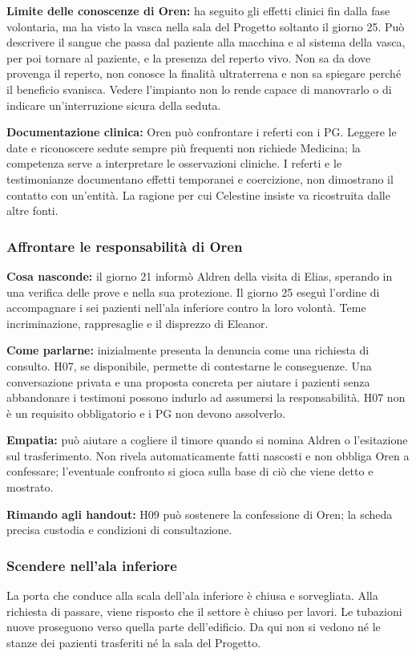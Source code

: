 \documentclass[11pt,a4paper]{article}
\begin{document}
\textbf{Limite delle conoscenze di Oren:} ha seguito gli effetti clinici fin dalla fase volontaria, ma ha visto la vasca nella sala del Progetto soltanto il giorno 25. Può descrivere il sangue che passa dal paziente alla macchina e al sistema della vasca, per poi tornare al paziente, e la presenza del reperto vivo. Non sa da dove provenga il reperto, non conosce la finalità ultraterrena e non sa spiegare perché il beneficio svanisca. Vedere l'impianto non lo rende capace di manovrarlo o di indicare un'interruzione sicura della seduta.

\textbf{Documentazione clinica:} Oren può confrontare i referti con i PG. Leggere le date e riconoscere sedute sempre più frequenti non richiede Medicina; la competenza serve a interpretare le osservazioni cliniche. I referti e le testimonianze documentano effetti temporanei e coercizione, non dimostrano il contatto con un'entità. La ragione per cui Celestine insiste va ricostruita dalle altre fonti.

\subsubsection{Affrontare le responsabilità di Oren}
\textbf{Cosa nasconde:} il giorno 21 informò Aldren della visita di Elias, sperando in una verifica delle prove e nella sua protezione. Il giorno 25 eseguì l'ordine di accompagnare i sei pazienti nell'ala inferiore contro la loro volontà. Teme incriminazione, rappresaglie e il disprezzo di Eleanor.

\textbf{Come parlarne:} inizialmente presenta la denuncia come una richiesta di consulto. H07, se disponibile, permette di contestarne le conseguenze. Una conversazione privata e una proposta concreta per aiutare i pazienti senza abbandonare i testimoni possono indurlo ad assumersi la responsabilità. H07 non è un requisito obbligatorio e i PG non devono assolverlo.

\textbf{Empatia:} può aiutare a cogliere il timore quando si nomina Aldren o l'esitazione sul trasferimento. Non rivela automaticamente fatti nascosti e non obbliga Oren a confessare; l'eventuale confronto si gioca sulla base di ciò che viene detto e mostrato.

\textbf{Rimando agli handout:} H09 può sostenere la confessione di Oren; la scheda precisa custodia e condizioni di consultazione.

\subsubsection{Scendere nell'ala inferiore}
\begin{readaloud}
La porta che conduce alla scala dell'ala inferiore è chiusa e sorvegliata. Alla richiesta di passare, viene risposto che il settore è chiuso per lavori. Le tubazioni nuove proseguono verso quella parte dell'edificio. Da qui non si vedono né le stanze dei pazienti trasferiti né la sala del Progetto.
\end{readaloud}
\end{document}
